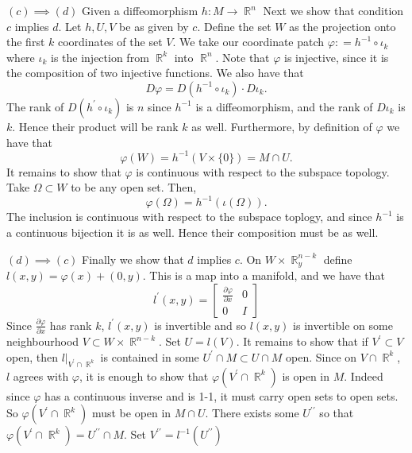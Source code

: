 \documentclass[letterpaper]{article}
\DeclareMathOperator{\R}{\mathbb{R}}
\begin{document}
\begin{description}
\item{$(c) \implies (d)$} \newline 
Given a diffeomorphism $h: M \to \R^n$ Next we show that condition $c$ implies $d$. Let $h,U,V$ be as given by $c$. Define the set $W$ as the projection onto the first $k$ coordinates of the set $V$. 
We take our coordinate patch $\varphi : = h^{-1} \circ \iota_k$ where $\iota_k$ is the injection from $\R^k$ into $\R^n$. Note that $\varphi$ is injective, since it is the composition of two injective functions. 
We also have that $$D\varphi = D(h^{-1}\circ \iota_k) \cdot D\iota_k.$$ The rank of $D(h^\prime \circ \iota_k)$ is $n$ since $h^{-1}$ is a diffeomorphism, and the rank of $D\iota_k$ is $k$. Hence their product will be rank $k$ as well.
Furthermore, by definition of $\varphi$ we have that $$\varphi(W) = h^{-1}(V \times \{0\}) = M\cap U.$$ 
It remains to show that $\varphi $ is continuous with respect to the subspace topology. Take $\Omega \subset W$ to be any open set. Then, $$\varphi(\Omega) = h^{-1}(\iota (\Omega)).$$ The inclusion is continuous with respect to the subspace toplogy, and since $h^{-1}$ is a continuous bijection it is as well. Hence their composition must be as well. 
\item{$(d) \implies (c)$} \newline
Finally we show that $d$ implies $c$. On $W \times \R_y^{n-k}$ define $l(x,y) = \varphi(x) + (0,y).$ This is a map into a manifold, and we have that $$l^\prime(x,y) = \begin{bmatrix}
    \frac{\partial \varphi}{\partial x} & 0 \\ 0 & I
\end{bmatrix}$$ Since $\frac{\partial \varphi}{\partial x}$ has rank $k$, $l^\prime(x,y)$ is invertible and so $l(x,y)$ is invertible on some neighbourhood $V \subset W \times \R^{n-k}$. Set $U = l(V)$. It remains to show that if $V^\prime \subset V$ open, then $l|_{V^\prime \cap \R^k}$ is contained in some $U^\prime \cap M \subset U \cap M$ open. Since on $V\cap \R^k$, $l$ agrees with $\varphi$, it is enough to show that $\varphi(V^\prime \cap \R^k ) $ is open in $M$. Indeed since $\varphi$ has a continuous inverse and is 1-1, it must carry open sets to open sets. So $\varphi(V^\prime \cap \R^k)$ must be open in $M \cap U$. There exists some $U^{\prime \prime}$ so that $\varphi(V^\prime \cap \R^k) = U^{\prime \prime} \cap M.$ Set $V^{\prime \prime } = l^{-1}(U^{\prime \prime})$
\end{description}
\end{document}
